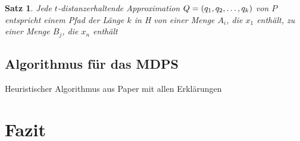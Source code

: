 \documentclass[11pt]{article}
\newtheorem{theorem}{Satz}[section]
\begin{document}
	\begin{theorem}
		Jede $t$-distanzerhaltende Approximation $Q = (q_1, q_2, \mathellipsis, q_k)$ von $P$ entspricht einem Pfad der Länge $k$ in H von einer Menge $A_i$, die $x_1$ enthält, zu einer Menge $B_j$, die $x_n$ enthält
	\end{theorem}
    
    \subsection{Algorithmus für das MDPS}
    \label{subsec:mdps}
    Heuristischer Algorithmus aus Paper mit allen Erklärungen

    \section{Fazit}
    \label{sec:fazit}

    
    
\end{document}
